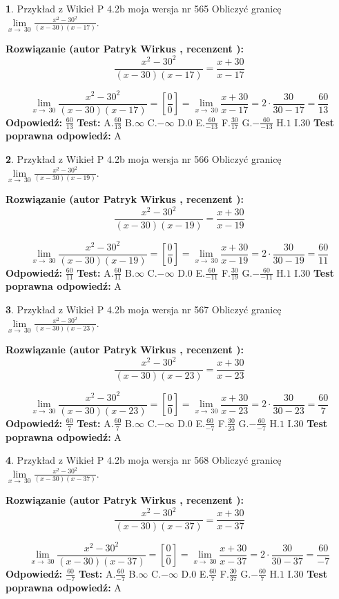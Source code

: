 \documentclass[12pt, a4paper]{article}
\theoremstyle{definition} %
\newtheorem{zad}{}
\newcommand{\zadStart}[1]{\begin{zad}#1\newline}
\newcommand{\zadStop}{\end{zad}}
\newcommand{\rozwStart}[2]{\noindent \textbf{Rozwiązanie (autor #1 , recenzent #2): }\newline}
\newcommand{\rozwStop}{\newline}
\newcommand{\odpStart}{\noindent \textbf{Odpowiedź:}\newline}
\newcommand{\odpStop}{\newline}
\newcommand{\testStart}{\noindent \textbf{Test:}\newline}
\newcommand{\testStop}{\newline}
\newcommand{\kluczStart}{\noindent \textbf{Test poprawna odpowiedź:}\newline}
\newcommand{\kluczStop}{\newline}
\begin{document}
\zadStart{Przykład z Wikieł P 4.2b moja wersja nr 565}
Obliczyć granicę $\lim\limits_{x\to\ 30}\frac{x^{2}-30^{2}}{(x-30)(x-17)}$.
\zadStop
\rozwStart{Patryk Wirkus}{}
$$\frac{x^{2}-30^{2}}{(x-30)(x-17)}=\frac{x+30}{x-17}$$

$$\lim\limits_{x\to\ 30}\frac{x^{2}-30^{2}}{(x-30)(x-17)}=[\frac{0}{0}]=\lim\limits_{x\to\ 30}\frac{x+30}{x-17}=2 \cdot \frac{30}{30-17} = \frac{60}{13}$$
\rozwStop
\odpStart
$\frac{60}{13}$
\odpStop
\testStart
A.$\frac{60}{13}$
B.$\infty$
C.$-\infty$
D.$0$
E.$\frac{60}{-13}$
F.$\frac{30}{17}$
G.$-\frac{60}{-13}$
H.$1$
I.$30$
\testStop
\kluczStart
A
\kluczStop



\zadStart{Przykład z Wikieł P 4.2b moja wersja nr 566}
Obliczyć granicę $\lim\limits_{x\to\ 30}\frac{x^{2}-30^{2}}{(x-30)(x-19)}$.
\zadStop
\rozwStart{Patryk Wirkus}{}
$$\frac{x^{2}-30^{2}}{(x-30)(x-19)}=\frac{x+30}{x-19}$$

$$\lim\limits_{x\to\ 30}\frac{x^{2}-30^{2}}{(x-30)(x-19)}=[\frac{0}{0}]=\lim\limits_{x\to\ 30}\frac{x+30}{x-19}=2 \cdot \frac{30}{30-19} = \frac{60}{11}$$
\rozwStop
\odpStart
$\frac{60}{11}$
\odpStop
\testStart
A.$\frac{60}{11}$
B.$\infty$
C.$-\infty$
D.$0$
E.$\frac{60}{-11}$
F.$\frac{30}{19}$
G.$-\frac{60}{-11}$
H.$1$
I.$30$
\testStop
\kluczStart
A
\kluczStop



\zadStart{Przykład z Wikieł P 4.2b moja wersja nr 567}
Obliczyć granicę $\lim\limits_{x\to\ 30}\frac{x^{2}-30^{2}}{(x-30)(x-23)}$.
\zadStop
\rozwStart{Patryk Wirkus}{}
$$\frac{x^{2}-30^{2}}{(x-30)(x-23)}=\frac{x+30}{x-23}$$

$$\lim\limits_{x\to\ 30}\frac{x^{2}-30^{2}}{(x-30)(x-23)}=[\frac{0}{0}]=\lim\limits_{x\to\ 30}\frac{x+30}{x-23}=2 \cdot \frac{30}{30-23} = \frac{60}{7}$$
\rozwStop
\odpStart
$\frac{60}{7}$
\odpStop
\testStart
A.$\frac{60}{7}$
B.$\infty$
C.$-\infty$
D.$0$
E.$\frac{60}{-7}$
F.$\frac{30}{23}$
G.$-\frac{60}{-7}$
H.$1$
I.$30$
\testStop
\kluczStart
A
\kluczStop



\zadStart{Przykład z Wikieł P 4.2b moja wersja nr 568}
Obliczyć granicę $\lim\limits_{x\to\ 30}\frac{x^{2}-30^{2}}{(x-30)(x-37)}$.
\zadStop
\rozwStart{Patryk Wirkus}{}
$$\frac{x^{2}-30^{2}}{(x-30)(x-37)}=\frac{x+30}{x-37}$$

$$\lim\limits_{x\to\ 30}\frac{x^{2}-30^{2}}{(x-30)(x-37)}=[\frac{0}{0}]=\lim\limits_{x\to\ 30}\frac{x+30}{x-37}=2 \cdot \frac{30}{30-37} = \frac{60}{-7}$$
\rozwStop
\odpStart
$\frac{60}{-7}$
\odpStop
\testStart
A.$\frac{60}{-7}$
B.$\infty$
C.$-\infty$
D.$0$
E.$\frac{60}{7}$
F.$\frac{30}{37}$
G.$-\frac{60}{7}$
H.$1$
I.$30$
\testStop
\kluczStart
A
\kluczStop
\end{document}
